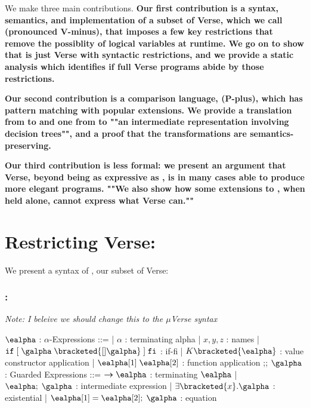 \documentclass[]{article}
\begin{document}
We make three main contributions. \bf{Our first contribution} is a syntax,
semantics, and implementation of a subset of Verse, which we call \Vminus
(pronounced V-minus), that imposes a few key restrictions that remove the
possiblity of logical variables at runtime. We go on
to show that \Vminus is just Verse with syntactic restrictions, and we provide a
static analysis which identifies if full Verse programs abide by those
restrictions. 


\bf{Our second contribution} is a comparison language, \Pplus (P-plus), which
has pattern matching with popular extensions. We provide  a translation from
\Pplus to \Vminus and one from \Vminus to ""an intermediate representation
involving decision trees"", and a proof that the transformations are
semantics-preserving. 

\bf{Our third contribution} is less formal: we present an argument that Verse,
beyond being as expressive as \Pplus, is in many cases able to produce more elegant
programs. ""We also show how some extensions to \Pplus, when held alone, cannot
express what Verse can.""

\section{Restricting Verse: \Vminus}

We present a syntax of \Vminus, our subset of Verse: 

\subsubsection{\Vminus:}
\it{Note: I beleive we should change this to the ${\mu}$Verse syntax}
\begin{center}
    \begin{bnf}
    $\ealpha$ : \textsf{$\alpha$-Expressions} ::=
    | $\alpha$ : terminating alpha
    | $x, y, z$ : names
    | $\tt{if} \; \tt{[}\; \galpha \; \bracketed{[] \galpha} \;\tt{]} \; \tt{fi}$ : if-fi 
    | $K \bracketed{\ealpha}$ : value constructor application 
    | $\ealpha[1] \; \ealpha[2]$ : function application 
    ;;
    $\galpha$ : \textsf{Guarded Expressions} ::=  
    $\boldsymbol{\rightarrow}\ealpha$ : terminating $\ealpha$ 
    | $\ealpha; \; \galpha$ : intermediate expression 
    | $\exists \bracketed{x} \tt{.} \galpha$ : existential 
    | $\ealpha[1] = \ealpha[2]; \; \galpha$ : equation 
    \end{bnf}
\end{center}
\end{document}
